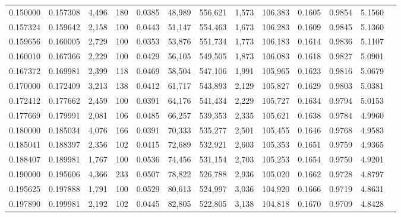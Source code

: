 \begin{tabular}{rrrrrrrrrrrrr}
0.150000 & 0.157308 & 4,496 & 180 &                                     0.0385 &  48,989 & 556,621 &   1,573 & 106,383 & 0.1605 & 0.9854 & 5.1560 \\
0.157324 & 0.159642 & 2,158 & 100 &                                     0.0443 &  51,147 & 554,463 &   1,673 & 106,283 & 0.1609 & 0.9845 & 5.1360 \\
0.159656 & 0.160005 & 2,729 & 100 &                                     0.0353 &  53,876 & 551,734 &   1,773 & 106,183 & 0.1614 & 0.9836 & 5.1107 \\
0.160010 & 0.167366 & 2,229 & 100 &                                     0.0429 &  56,105 & 549,505 &   1,873 & 106,083 & 0.1618 & 0.9827 & 5.0901 \\
0.167372 & 0.169981 & 2,399 & 118 &                                     0.0469 &  58,504 & 547,106 &   1,991 & 105,965 & 0.1623 & 0.9816 & 5.0679 \\
0.170000 & 0.172409 & 3,213 & 138 &                                     0.0412 &  61,717 & 543,893 &   2,129 & 105,827 & 0.1629 & 0.9803 & 5.0381 \\
0.172412 & 0.177662 & 2,459 & 100 &                                     0.0391 &  64,176 & 541,434 &   2,229 & 105,727 & 0.1634 & 0.9794 & 5.0153 \\
0.177669 & 0.179991 & 2,081 & 106 &                                     0.0485 &  66,257 & 539,353 &   2,335 & 105,621 & 0.1638 & 0.9784 & 4.9960 \\
0.180000 & 0.185034 & 4,076 & 166 &                                     0.0391 &  70,333 & 535,277 &   2,501 & 105,455 & 0.1646 & 0.9768 & 4.9583 \\
0.185041 & 0.188397 & 2,356 & 102 &                                     0.0415 &  72,689 & 532,921 &   2,603 & 105,353 & 0.1651 & 0.9759 & 4.9365 \\
0.188407 & 0.189981 & 1,767 & 100 &                                     0.0536 &  74,456 & 531,154 &   2,703 & 105,253 & 0.1654 & 0.9750 & 4.9201 \\
0.190000 & 0.195606 & 4,366 & 233 &                                     0.0507 &  78,822 & 526,788 &   2,936 & 105,020 & 0.1662 & 0.9728 & 4.8797 \\
0.195625 & 0.197888 & 1,791 & 100 &                                     0.0529 &  80,613 & 524,997 &   3,036 & 104,920 & 0.1666 & 0.9719 & 4.8631 \\
0.197890 & 0.199981 & 2,192 & 102 &                                     0.0445 &  82,805 & 522,805 &   3,138 & 104,818 & 0.1670 & 0.9709 & 4.8428 \\

\end{tabular}
